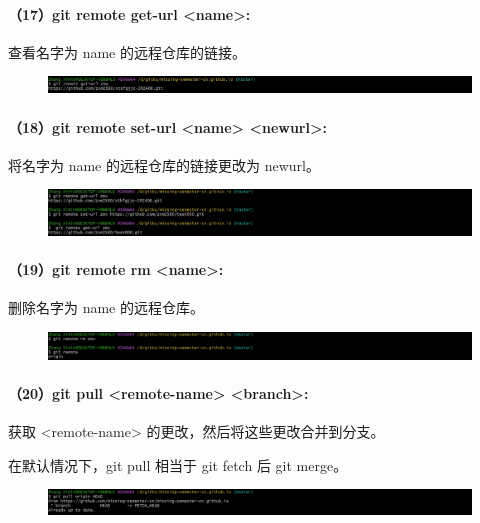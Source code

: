 \documentclass[a4paper, 12pt]{article}
\begin{document}
	\paragraph{（17）git remote get-url <name>:}
	查看名字为 name 的远程仓库的链接。	
	
	\begin{figure}[H]
		\centering
		\includegraphics[width=1\textwidth]{033.jpg}
	\end{figure}
	
	\paragraph{（18）git remote set-url <name> <newurl>:}
	将名字为 name 的远程仓库的链接更改为 newurl。
	
	\begin{figure}[H]
		\centering
		\includegraphics[width=1\textwidth]{034.jpg}
	\end{figure}
	
	\paragraph{（19）git remote rm <name>:}
	删除名字为 name 的远程仓库。
	
	\begin{figure}[H]
		\centering
		\includegraphics[width=1\textwidth]{035.jpg}
	\end{figure}
	
	\paragraph{（20）git pull <remote-name> <branch>:}
	获取 <remote-name> 的更改，然后将这些更改合并到分支。
	
	在默认情况下，git pull 相当于 git fetch 后 git merge。
	
	\begin{figure}[H]
		\centering
		\includegraphics[width=1\textwidth]{036.jpg}
	\end{figure}
	
\end{document}
